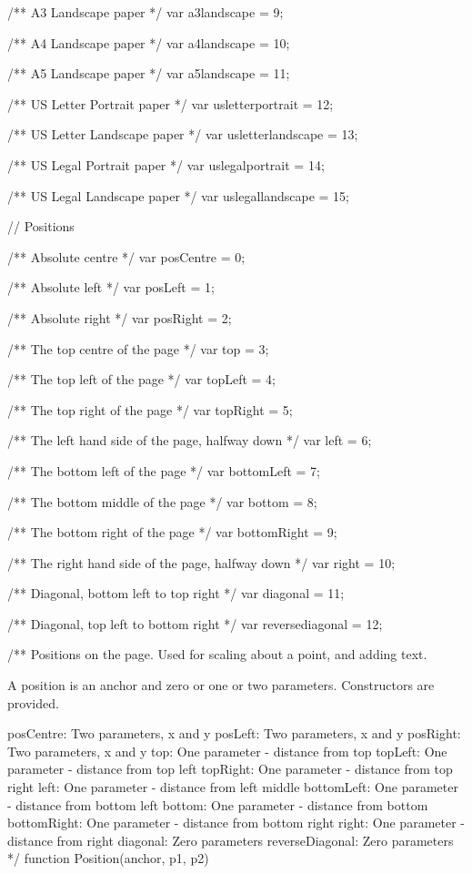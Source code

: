 /** A3 Landscape paper */
var a3landscape = 9;

/** A4 Landscape paper */
var a4landscape = 10;

/** A5 Landscape paper */
var a5landscape = 11;

/** US Letter Portrait paper */
var usletterportrait = 12;

/** US Letter Landscape paper */
var usletterlandscape = 13;

/** US Legal Portrait paper */
var uslegalportrait = 14;

/** US Legal Landscape paper */
var uslegallandscape = 15;


// Positions

/** Absolute centre */
var posCentre = 0;

/** Absolute left */
var posLeft = 1;

/** Absolute right */
var posRight = 2;

/** The top centre of the page */
var top = 3;

/** The top left of the page */
var topLeft = 4;

/** The top right of the page */
var topRight = 5;

/** The left hand side of the page, halfway down */
var left = 6;

/** The bottom left of the page */
var bottomLeft = 7;

/** The bottom middle of the page */
var bottom = 8;

/** The bottom right of the page */
var bottomRight = 9;

/** The right hand side of the page, halfway down */
var right = 10;

/** Diagonal, bottom left to top right */
var diagonal = 11;

/** Diagonal, top left to bottom right */
var reversediagonal = 12;

/** Positions on the page. Used for scaling about a point, and adding text.

A position is an anchor and zero or one or two parameters. Constructors are provided.

posCentre: Two parameters, x and y
posLeft: Two parameters, x and y
posRight: Two parameters, x and y
top: One parameter - distance from top
topLeft: One parameter - distance from top left
topRight: One parameter - distance from top right
left: One parameter - distance from left middle
bottomLeft: One parameter - distance from bottom left
bottom: One parameter - distance from bottom
bottomRight: One parameter - distance from bottom right
right: One parameter - distance from right
diagonal: Zero parameters
reverseDiagonal: Zero parameters */
function Position(anchor, p1, p2)


